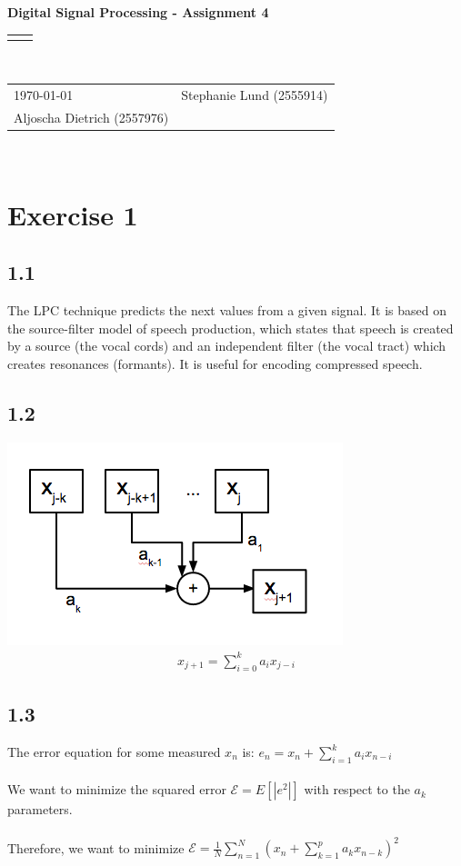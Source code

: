 \documentclass[12pt]{article}
\renewcommand{\title}[1]{\textbf{#1}\\}
\renewcommand{\line}{\begin{tabularx}{\textwidth}{X>{\raggedleft}X}\hline\\\end{tabularx}\\[-0.5cm]}
\newcommand{\leftright}[2]{\begin{tabularx}{\textwidth}{X>{\raggedleft}X}#1%
& #2\\\end{tabularx}\\[-0.5cm]}
\begin{document}
\title{Digital Signal Processing - Assignment 4}
\line
\leftright{\today}{Stephanie Lund (2555914)\\Aljoscha Dietrich (2557976)} %

\section*{Exercise 1}

\subsection*{1.1}
The LPC technique predicts the next values from a given signal. It is based on the source-filter model of speech production, which states that speech is created by a source (the vocal cords) and an independent filter (the vocal tract) which creates resonances (formants). It is useful for encoding compressed speech.

\subsection*{1.2}
\includegraphics[scale=0.65]{hw4-2.png}
\begin{align*}
	x_{j+1} = \sum_{i=0}^{k} a_i x_{j-i}
\end{align*}

\subsection*{1.3}
The error equation for some measured $x_n$ is: $e_n = x_n + \sum_{i=1}^k a_i x_{n-i}$\\\\
We want to minimize the squared error $\mathcal{E} = E[ |e^2| ]$ with respect to the $a_k$ parameters.\\\\
Therefore, we want to minimize $\mathcal{E} = \frac{1}{N} \sum_{n=1}^N (x_n + \sum_{k=1}^p a_k x_{n-k})^2$\\\\
\end{document}
